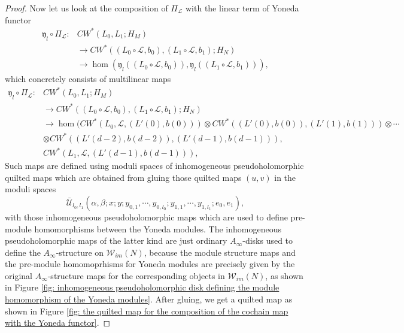 \documentclass{amsart}
\numberwithin{equation}{section}
\numberwithin{figure}{section}
\begin{document}
\begin{proof}
	Now let us look at the composition of $\Pi_{\mathcal{L}}$ with the linear term of Yoneda functor
\begin{equation}
\begin{split}
\mathfrak{y}_{l} \circ \Pi_{\mathcal{L}}: & CW^{*}(L_{0}, L_{1}; H_{M})\\
& \to CW^{*}((L_{0} \circ \mathcal{L}, b_{0}), (L_{1} \circ \mathcal{L}, b_{1}); H_{N})\\
& \to \hom(\mathfrak{y}_{l}((L_{0} \circ \mathcal{L}, b_{0})), \mathfrak{y}_{l}((L_{1} \circ \mathcal{L}, b_{1}))),
\end{split}
\end{equation}
which concretely consists of multilinear maps
\begin{equation}
\begin{split}
\mathfrak{y}_{l} \circ \Pi_{\mathcal{L}}: & CW^{*}(L_{0}, L_{1}; H_{M})\\
& \to CW^{*}((L_{0} \circ \mathcal{L}, b_{0}), (L_{1} \circ \mathcal{L}, b_{1}); H_{N})\\
& \to \hom(CW^{*}(L_{0}, \mathcal{L}, (L'(0), b(0))) \otimes CW^{*}((L'(0), b(0)), (L'(1), b(1))) \otimes \cdots\\
& \otimes CW^{*}((L'(d-2), b(d-2)), (L'(d-1), b(d-1))),\\
& CW^{*}(L_{1}, \mathcal{L}, (L'(d-1), b(d-1))),
\end{split}
\end{equation}
Such maps are defined using moduli spaces of inhomogeneous pseudoholomorphic quilted maps which are obtained from gluing those quilted maps $(u, v)$ in the moduli spaces
\begin{equation*}
\bar{\mathcal{U}}_{l_{0}, l_{1}}(\alpha, \beta; x; y; y_{0, 1}, \cdots, y_{0, l_{0}}; y_{1, 1}, \cdots, y_{1, l_{1}}; e_{0}, e_{1}),
\end{equation*}
with those inhomogeneous pseudoholomorphic maps which are used to define pre-module homomorphisms between the Yoneda modules. The inhomogeneous pseudoholomorphic maps of the latter kind are just ordinary $A_{\infty}$-disks used to define the $A_{\infty}$-structure on $\mathcal{W}_{im}(N)$, because the module structure maps and the pre-module homomoprhisms for Yoneda modules are precisely given by the original $A_{\infty}$-structure maps for the corresponding objects in $\mathcal{W}_{im}(N)$, as shown in Figure \ref{fig: inhomogeneous pseudoholomorphic disk defining the module homomorphism of the Yoneda modules}. After gluing, we get a quilted map as shown in Figure \ref{fig: the quilted map for the composition of the cochain map with the Yoneda functor}. \par

\end{proof}
\end{document}
